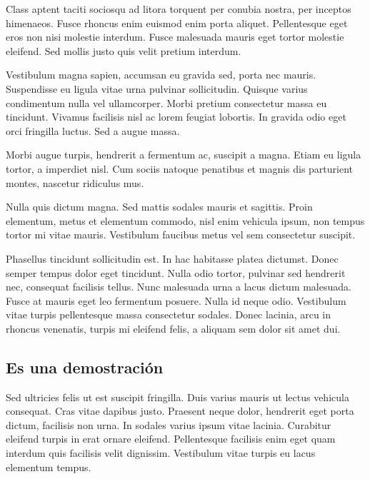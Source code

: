 \documentclass[11pt,a4paper]{article}
\begin{document}
Class aptent taciti sociosqu ad litora torquent per conubia nostra, per inceptos himenaeos. Fusce rhoncus enim euismod enim porta aliquet. Pellentesque eget eros non nisi molestie interdum. Fusce malesuada mauris eget tortor molestie eleifend. Sed mollis justo quis velit pretium interdum. 
\vskip 3cm

Vestibulum magna sapien, accumsan eu gravida sed, porta nec mauris. Suspendisse eu ligula vitae urna pulvinar sollicitudin. Quisque varius condimentum nulla vel ullamcorper. Morbi pretium consectetur massa eu tincidunt. Vivamus facilisis nisl ac lorem feugiat lobortis. In gravida odio eget orci fringilla luctus. Sed a augue massa.

Morbi augue turpis, hendrerit a fermentum ac, suscipit a magna. Etiam eu ligula tortor, a imperdiet nisl. Cum sociis natoque penatibus et magnis dis parturient montes, nascetur ridiculus mus. 

Nulla quis dictum magna. Sed mattis sodales mauris et sagittis. Proin elementum, metus et elementum commodo, nisl enim vehicula ipsum, non tempus tortor mi vitae mauris. Vestibulum faucibus metus vel sem consectetur suscipit.

Phasellus tincidunt sollicitudin est. In hac habitasse platea dictumst. Donec semper tempus dolor eget tincidunt. Nulla odio tortor, pulvinar sed hendrerit nec, consequat facilisis tellus. Nunc malesuada urna a lacus dictum malesuada. Fusce at mauris eget leo fermentum posuere. Nulla id neque odio. Vestibulum vitae turpis pellentesque massa consectetur sodales. Donec lacinia, arcu in rhoncus venenatis, turpis mi eleifend felis, a aliquam sem dolor sit amet dui. 


\subsection{Es una demostración}


Sed ultricies felis ut est suscipit fringilla. Duis varius mauris ut lectus vehicula consequat. Cras vitae dapibus justo. Praesent neque dolor, hendrerit eget porta dictum, facilisis non urna. In sodales varius ipsum vitae lacinia. Curabitur eleifend turpis in erat ornare eleifend. Pellentesque facilisis enim eget quam interdum quis facilisis velit dignissim. Vestibulum vitae turpis eu lacus elementum tempus. 
\end{document}
